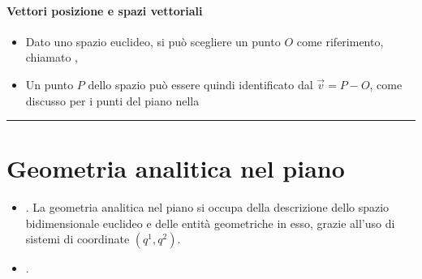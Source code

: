 \documentclass[letterpaper,10pt,italian]{jupyterBook}
\begin{document}
\subsubsection*{Vettori posizione e spazi vettoriali}
\begin{itemize}
\item {} 
\sphinxAtStartPar
Dato uno spazio euclideo, si può scegliere un punto \(O\) come riferimento, chiamato ,

\item {} 
\sphinxAtStartPar
Un punto \(P\) dello spazio può essere quindi identificato dal  \(\vec{v} = P - O\), come discusso per i punti del piano nella {\hyperref[\detokenize{ch/analytic_geometry/analytic_geometry_2d/vectors:geometry-analytic-2d-vectors}]{}}

\end{itemize}

\sphinxAtStartPar
{} 






\bigskip\hrule\bigskip


\sphinxstepscope




\chapter{Geometria analitica nel piano}
\label{\detokenize{ch/analytic_geometry/analytic_geometry_2d:geometria-analitica-nel-piano}}\label{\detokenize{ch/analytic_geometry/analytic_geometry_2d:geometry-analytic-2d}}\label{\detokenize{ch/analytic_geometry/analytic_geometry_2d::doc}}
\sphinxAtStartPar
{}
\begin{itemize}
\item {} 
\sphinxAtStartPar
{\hyperref[\detokenize{ch/analytic_geometry/analytic_geometry_2d/coordinates:geometry-analytic-2d-coordinates}]{}}. La geometria analitica nel piano si occupa della descrizione dello spazio bidimensionale euclideo e delle entità geometriche in esso, grazie all’uso di sistemi di coordinate \((q^1, q^2)\).

\item {} 
\sphinxAtStartPar
{\hyperref[\detokenize{ch/analytic_geometry/analytic_geometry_2d/vectors:geometry-analytic-2d-vectors}]{}}.

\end{itemize}
\end{document}
